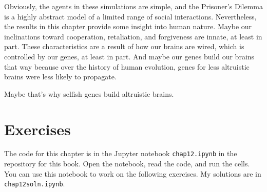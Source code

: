 \documentclass[12pt]{book}
\theoremstyle{exercise}
\begin{document}
Obviously, the agents in these simulations are simple, and the Prisoner's Dilemma is a highly abstract model of a limited range of social interactions.  Nevertheless, the results in this chapter provide some insight into human nature.  Maybe our inclinations toward cooperation, retaliation, and forgiveness are innate, at least in part.  These characteristics are a result of how our brains are wired, which is controlled by our genes, at least in part.  And maybe our genes build our brains that way because over the history of human evolution, genes for less altruistic brains were less likely to propagate.


Maybe that's why selfish genes build altruistic brains.


\section{Exercises}

The code for this chapter is in the Jupyter notebook {\tt chap12.ipynb}
in the repository for this book.  Open the notebook, read the code,
and run the cells.  You can use this notebook to work on the
following exercises.  My solutions are in {\tt chap12soln.ipynb}.
\end{document}
